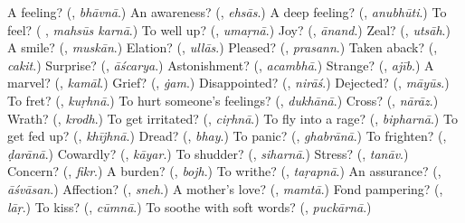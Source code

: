 \begin{tcolorbox}[breakable,colback=teal!4,colframe=teal!35!black,title={Before you move on}]
A feeling? (\textbf{}, \emph{bhāvnā}.) An awareness? (\textbf{}, \emph{ehsās}.) A deep feeling? (\textbf{}, \emph{anubhūti}.) To feel? (\textbf{ }, \emph{mahsūs karnā}.) To well up? (\textbf{}, \emph{umaṛnā}.) Joy? (\textbf{}, \emph{ānand}.) Zeal? (\textbf{}, \emph{utsāh}.) A smile? (\textbf{}, \emph{muskān}.) Elation? (\textbf{}, \emph{ullās}.) Pleased? (\textbf{}, \emph{prasann}.) Taken aback? (\textbf{}, \emph{cakit}.) Surprise? (\textbf{}, \emph{āścarya}.) Astonishment? (\textbf{}, \emph{acambhā}.) Strange? (\textbf{}, \emph{ajīb}.) A marvel? (\textbf{}, \emph{kamāl}.) Grief? (\textbf{}, \emph{ġam}.) Disappointed? (\textbf{}, \emph{nirāś}.) Dejected? (\textbf{}, \emph{māyūs}.) To fret? (\textbf{}, \emph{kuṛhnā}.) To hurt someone's feelings? (\textbf{}, \emph{dukhānā}.) Cross? (\textbf{}, \emph{nārāz}.) Wrath? (\textbf{}, \emph{krodh}.) To get irritated? (\textbf{}, \emph{ciṛhnā}.) To fly into a rage? (\textbf{}, \emph{bipharnā}.) To get fed up? (\textbf{}, \emph{khījhnā}.) Dread? (\textbf{}, \emph{bhay}.) To panic? (\textbf{}, \emph{ghabrānā}.) To frighten? (\textbf{}, \emph{ḍarānā}.) Cowardly? (\textbf{}, \emph{kāyar}.) To shudder? (\textbf{}, \emph{siharnā}.) Stress? (\textbf{}, \emph{tanāv}.) Concern? (\textbf{}, \emph{fikr}.) A burden? (\textbf{}, \emph{bojh}.) To writhe? (\textbf{}, \emph{taṛapnā}.) An assurance? (\textbf{}, \emph{āśvāsan}.) Affection? (\textbf{}, \emph{sneh}.) A mother's love? (\textbf{}, \emph{mamtā}.) Fond pampering? (\textbf{}, \emph{lāṛ}.) To kiss? (\textbf{}, \emph{cūmnā}.) To soothe with soft words? (\textbf{}, \emph{puckārnā}.)
\end{tcolorbox}
